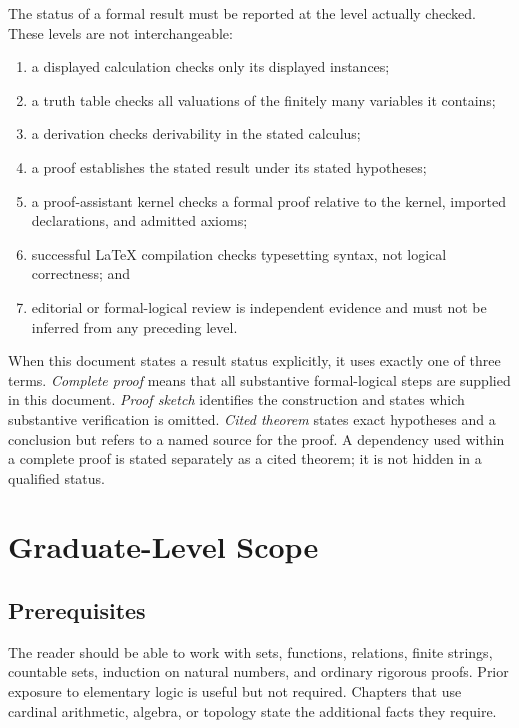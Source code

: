 \documentclass[11pt,oneside,openany]{book}
\theoremstyle{definition}
\theoremstyle{plain}
\theoremstyle{remark}
\begin{document}
The status of a formal result must be reported at the level actually checked.
These levels are not interchangeable:
\begin{enumerate}
  \item a displayed calculation checks only its displayed instances;
  \item a truth table checks all valuations of the finitely many variables it
        contains;
  \item a derivation checks derivability in the stated calculus;
  \item a proof establishes the stated result under its stated
        hypotheses;
  \item a proof-assistant kernel checks a formal proof relative to the kernel,
        imported declarations, and admitted axioms;
  \item successful \LaTeX{} compilation checks typesetting syntax, not logical
        correctness; and
  \item editorial or formal-logical review is independent evidence and must not be
        inferred from any preceding level.
\end{enumerate}

When this document states a result status explicitly, it uses exactly one of
three terms.  \emph{Complete proof} means that all substantive formal-logical
steps are supplied in this document.  \emph{Proof sketch} identifies the
construction and states which substantive verification is omitted.
\emph{Cited theorem} states exact hypotheses and a conclusion but refers to a
named source for the proof.  A dependency used within a complete proof is
stated separately as a cited theorem; it is not hidden in a qualified status.

\chapter*{Graduate-Level Scope}

\section*{Prerequisites}

The reader should be able to work with sets, functions, relations, finite
strings, countable sets, induction on natural numbers, and ordinary rigorous
proofs.  Prior exposure to elementary logic is useful but not
required.  Chapters that use cardinal arithmetic, algebra, or topology state
the additional facts they require.
\end{document}
